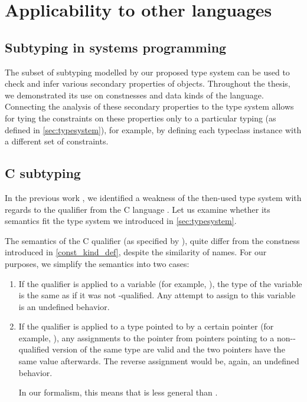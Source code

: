 \section{Applicability to other languages}

\subsection{Subtyping in systems programming}

The subset of subtyping modelled by our proposed type system can be used to check and infer various secondary properties of objects. Throughout the thesis, we demonstrated its use on constnesses and data kinds of the \cmm language. Connecting the analysis of these secondary properties to the type system allows for tying the constraints on these properties only to a particular typing (as defined in \cref{sec:typesystem}), for example, by defining each typeclass instance with a different set of constraints.

\subsection{C subtyping}

In the previous work \cite{klepl2020type}, we identified a weakness of the then-used type system with regards to the  qualifier from the C language \cite{cstandard2018}. Let us examine whether its semantics fit the type system we introduced in \cref{sec:typesystem}.

The semantics of the C  qualifier (as specified by \cite{cstandard2018}), quite differ from the constness introduced in \cref{const_kind_def}, despite the similarity of names. For our purposes, we simplify the semantics into two cases:

\begin{enumerate}
    \item If the  qualifier is applied to a variable (for example, ), the type of the variable is the same as if it was not -qualified. Any attempt to assign to this variable is an undefined behavior. \label{constvar}

    \item If the  qualifier is applied to a type pointed to by a certain pointer (for example, ), any assignments to the pointer from pointers pointing to a non--qualified version of the same type are valid and the two pointers have the same value afterwards. The reverse assignment would be, again, an undefined behavior. \label{pointerSubtype}

    In our formalism, this means that  is less general than .
\end{enumerate}


